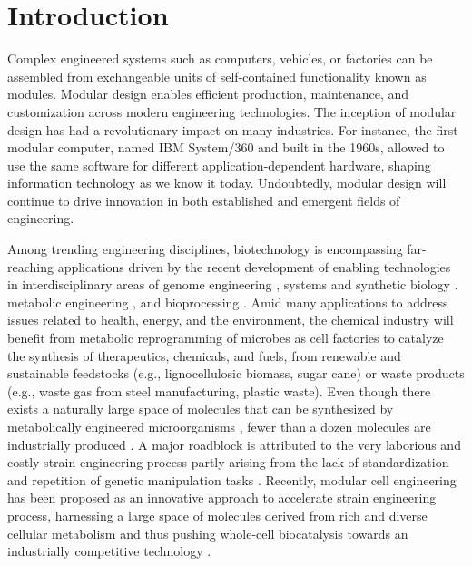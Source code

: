 

\section{Introduction}

Complex engineered systems such as computers, vehicles, or factories can be assembled from exchangeable units of self-contained functionality known as modules.
Modular design enables efficient production, maintenance, and customization across modern engineering technologies.
The inception of modular design has had a revolutionary impact on many industries.
For instance, the first modular computer, named IBM System/360 and built in the 1960s, allowed to use the same software for different application-dependent hardware, shaping information technology as we know it today.\citep{o2018}
Undoubtedly, modular design will continue to drive innovation in both established and emergent fields of engineering.

Among trending engineering disciplines, biotechnology is encompassing far-reaching applications driven by the recent development of enabling technologies in interdisciplinary areas of genome engineering \citep{barrangou2016}, systems and synthetic biology \citep{kahl2013}.
metabolic engineering \citep{nielsen2016}, and bioprocessing \citep{cramer2011, olson2012}.
Amid many applications to address issues related to health, energy, and the environment, the chemical industry will benefit from metabolic reprogramming of microbes as cell factories to catalyze the synthesis of therapeutics, chemicals, and fuels, from renewable and sustainable feedstocks (e.g., lignocellulosic biomass, sugar cane) or waste products (e.g., waste gas from steel manufacturing, plastic waste).
Even though there exists a naturally large space of molecules that can be synthesized by metabolically engineered microorganisms \citep{lee2019}, fewer than a dozen molecules are industrially produced \citep{nielsen2016}.
A major roadblock is attributed to the very laborious and costly strain engineering process partly arising from the lack of standardization and repetition of genetic manipulation tasks \citep{king2017, winkler2015}.
Recently, modular cell engineering has been proposed as an innovative approach to accelerate strain engineering process, harnessing a large space of molecules derived from rich and diverse cellular metabolism and thus pushing whole-cell biocatalysis towards an industrially competitive technology \citep{trinh2016}.


